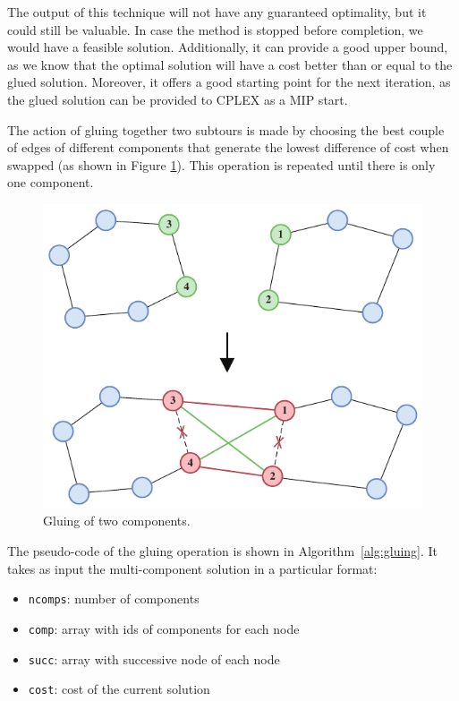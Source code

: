 The output of this technique will not have any guaranteed optimality, but it could still be valuable. In case the method is stopped before completion, we would have a feasible solution. Additionally, it can provide a good upper bound, as we know that the optimal solution will have a cost better than or equal to the glued solution. Moreover, it offers a good starting point for the next iteration, as the glued solution can be provided to CPLEX as a MIP start.

The action of gluing together two subtours is made by choosing the best couple of edges of different components that generate the lowest difference of cost when swapped (as shown in Figure \ref{fig:patch_img}). This operation is repeated until there is only one component.

\begin{figure}
    \centering
    \includegraphics[width=0.8\linewidth]{Immagini/patch.pdf}
    \caption{Gluing of two components.}
    \label{fig:patch_img}
\end{figure}

\newpage

The pseudo-code of the gluing operation is shown in Algorithm~\ref{alg:gluing}. It takes as input the multi-component solution in a particular format:
\begin{itemize}[noitemsep]
    \item \texttt{ncomps}: number of components
    \item \texttt{comp}: array with ids of components for each node
    \item \texttt{succ}: array with successive node of each node
    \item \texttt{cost}: cost of the current solution
\end{itemize}


